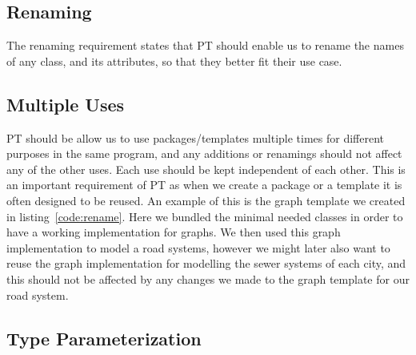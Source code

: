 \subsection{Renaming}\label{subsec:renaming}

%

The renaming requirement states that PT should enable us to rename the names of any class, and its attributes, so that they better fit their use case.

\subsection{Multiple Uses}\label{subsec:multiple-uses}
%
PT should be allow us to use packages/templates multiple times for different purposes in the same program, and any additions or renamings should not affect any of the other uses.
Each use should be kept independent of each other.
This is an important requirement of PT as when we create a package or a template it is often designed to be reused.
An example of this is the graph template we created in listing~\vref{code:rename}.
Here we bundled the minimal needed classes in order to have a working implementation for graphs.
We then used this graph implementation to model a road systems, however we might later also want to reuse the graph implementation for modelling the sewer systems of each city, and this should not be affected by any changes we made to the graph template for our road system.

\subsection{Type Parameterization}\label{subsec:type-parameterization}

%

